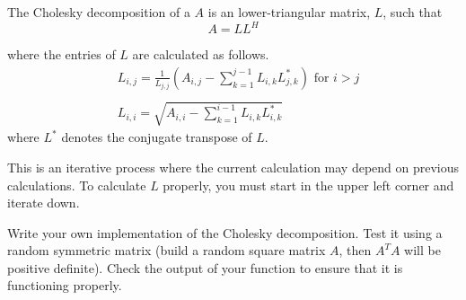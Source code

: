 The Cholesky decomposition of a $A$ is an lower-triangular matrix, $L$, such that
\begin{equation*}
 A = LL^H
\end{equation*}

where the entries of $L$ are calculated as follows.
\begin{align*}
&L_{i,j} = \frac{1}{L_{j,j}}\left(A_{i,j} -\sum_{k=1}^{j-1}{L_{i,k}L_{j,k}^*}\right) \mbox{ for $i>j$} \\ \\
&L_{i,i} = \sqrt{A_{i,i} - \sum_{k=1}^{i-1}{L_{i,k}L_{i,k}^*}}
\end{align*}
where $L^*$ denotes the conjugate transpose of $L$.

This is an iterative process where the current calculation may depend on previous calculations.  To calculate $L$ properly, you must start in the upper left corner and iterate down.

\begin{problem}
Write your own implementation of the Cholesky decomposition. Test it using a random symmetric matrix (build a random square matrix $A$, then $A^TA$ will be positive definite). Check the output of your function to ensure that it is functioning properly.
\end{problem}

